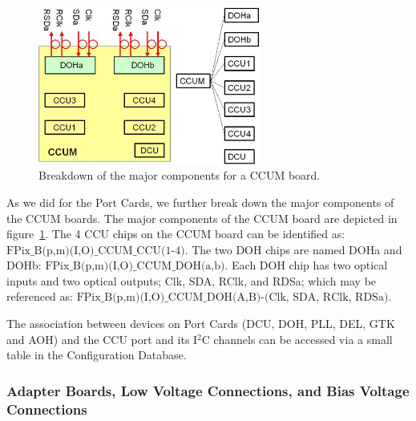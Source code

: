 \documentclass{cmspaper}
\begin{document}
\begin{figure}[hbtp]   
  \begin{center}   
        \includegraphics[width =0.65\textwidth]{new_CCU_v1.eps}   
    \caption{Breakdown of the major components for a CCUM board.}   
    \label{figure:ccum}   
  \end{center}   
\end{figure} 

As we did for the Port Cards, we further break down the major components of the CCUM boards.
The major components of the CCUM board are depicted in figure~\ref{figure:ccum}.
The 4 CCU chips on the CCUM board can be identified as:
$\mbox{FPix\_B(p,m)(I,O)\_CCUM\_CCU(1-4).}$
The two DOH chips are named DOHa and DOHb:
$\mbox{FPix\_B(p,m)(I,O)\_CCUM\_DOH(a,b).}$
Each DOH chip has two optical inputs and two optical outputs; 
Clk, SDA, RClk, and RDSa; which may be referenced as:
$\mbox{FPix\_B(p,m)(I,O)\_CCUM\_DOH(A,B)-(Clk, SDA, RClk, RDSa).}$

The association between devices on Port Cards (DCU, DOH, PLL, DEL, GTK and AOH)
and the CCU port and its I$^2$C channels can be accessed via a small  
table in the Configuration Database.



\subsubsection{Adapter Boards, Low Voltage Connections, and
Bias Voltage Connections \label{sec:adp}}
\end{document}
